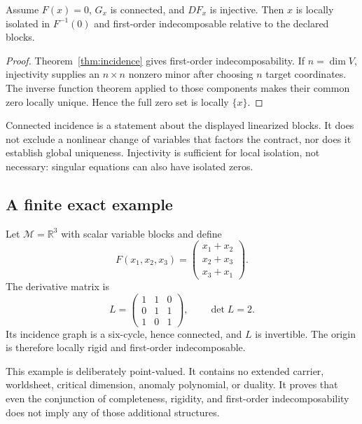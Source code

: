 \documentclass[11pt]{article}
\newcommand{\Mod}{\mathcal M}
\begin{document}
\begin{corollary}\label{cor:rigid-saturation}
Assume $F(x)=0$, $G_x$ is connected, and $DF_x$ is injective.  Then $x$ is
locally isolated in $F^{-1}(0)$ and first-order indecomposable relative to the
declared blocks.
\end{corollary}

\begin{proof}
Theorem~\ref{thm:incidence} gives first-order indecomposability.  If
$n=\dim V$, injectivity supplies an $n\times n$ nonzero minor after choosing
$n$ target coordinates.  The inverse function theorem applied to those
components makes their common zero locally unique.  Hence the full zero set is
locally $\{x\}$.
\end{proof}

\begin{remark}
Connected incidence is a statement about the displayed linearized blocks.
It does not exclude a nonlinear change of variables that factors the contract,
nor does it establish global uniqueness.  Injectivity is sufficient for local
isolation, not necessary: singular equations can also have isolated zeros.
\end{remark}

\subsection{A finite exact example}

Let $\Mod=\mathbb R^3$ with scalar variable blocks and define
\[
 F(x_1,x_2,x_3)
 =
 \begin{pmatrix}
 x_1+x_2\\
 x_2+x_3\\
 x_3+x_1
 \end{pmatrix}.
\]
The derivative matrix is
\[
 L=
 \begin{pmatrix}
 1&1&0\\
 0&1&1\\
 1&0&1
 \end{pmatrix},
 \qquad
 \det L=2.
\]
Its incidence graph is a six-cycle, hence connected, and $L$ is invertible.
The origin is therefore locally rigid and first-order indecomposable.

This example is deliberately point-valued.  It contains no extended carrier,
worldsheet, critical dimension, anomaly polynomial, or duality.  It proves
that even the conjunction of completeness, rigidity, and first-order
indecomposability does not imply any of those additional structures.
\end{document}
